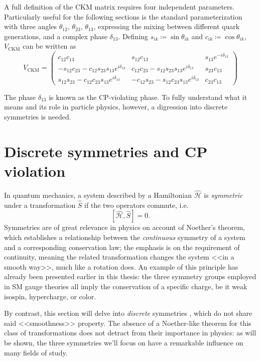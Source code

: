 A full definition of the CKM matrix requires four independent parameters.
Particularly useful for the following sections is the standard parameterization with three angles $\theta_{12}$, $\theta_{23}$, $\theta_{13}$, expressing the mixing between different quark generations, and a complex phase $\delta_{13}$.
Defining $s_{ik} \coloneqq \sin\theta_{ik}$ and $c_{ik} \coloneqq \cos\theta_{ik}$, $V_\text{CKM}$ can be written as
\begin{equation}
	V_\text{CKM}
	=
	\begin{pmatrix}
		c_{12} c_{13}
		&
		s_{12} c_{13}
		&
		s_{13} e^{-i\delta_{13}}
		\\
		- s_{12} c_{23} - c_{12} s_{23} s_{13} e^{i\delta_{13}}
		&
		c_{12} c_{23} - s_{12} s_{23} s_{13} e^{i\delta_{13}}
		&
		s_{23} c_{13}
		\\
		s_{12} s_{23} - c_{12} c_{23} s_{13} e^{i\delta_{13}}
		&
		-c_{12} s_{23} - s_{12} c_{23} s_{13} e^{i\delta_{13}}
		&
		c_{23} c_{13}
	\end{pmatrix}	
	\label{eq:CKM-matrix-parameterization}
\end{equation}

The phase $\delta_{13}$ is known as the CP-violating phase. To fully understand what it means and its role in particle physics, however, a digression into discrete symmetries is needed.

\section{Discrete symmetries and CP violation}
\label{sec:discrete}
In quantum mechanics, a system described by a Hamiltonian $\hat{\mathcal{H}}$ is \textit{symmetric} under a transformation $\hat{S}$ if the two operators commute, i.e.
\begin{equation}
\left[ \hat{\mathcal{H}}, \hat{S} \right] = 0.
\end{equation}
Symmetries are of great relevance in physics on account of Noether's theorem, which establishes a relationship between the \textit{continuous} symmetry of a system and a corresponding conservation law;
the emphasis is on the requirement of continuity, meaning the related transformation changes the system <<in a smooth way>>, much like a rotation does.
An example of this principle has already been presented earlier in this thesis:
the three symmetry groups employed in SM gauge theories all imply the conservation of a specific charge, be it weak isospin, hypercharge, or color.

By contrast, this section will delve into \textit{discrete} symmetries \cite{discrete}, which do not share said <<smoothness>> property.
The absence of a Noether-like theorem for this class of transformations does not detract from their importance in physics:
as will be shown, the three symmetries we'll focus on have a remarkable influence on many fields of study.

